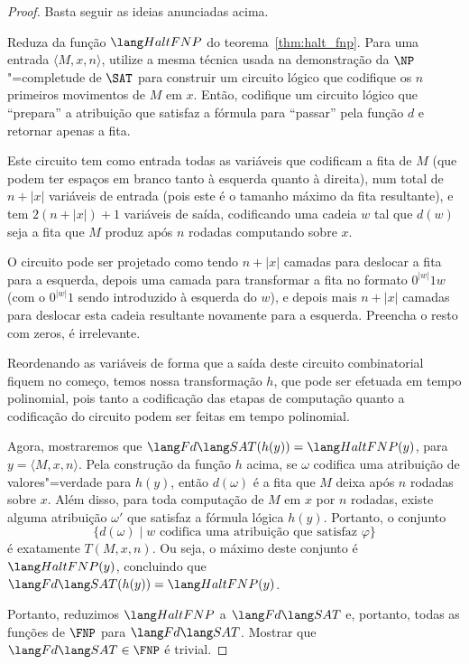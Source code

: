 \begin{proof}
    Basta seguir as ideias anunciadas acima.

    Reduza da função $\HaltFNP$ do teorema~\ref{thm:halt_fnp}.
    Para uma entrada $\langle M, x, n \rangle$,
    utilize a mesma técnica usada na demonstração da $\NP$"=completude de $\SAT$
    para construir um circuito lógico
    que codifique os $n$ primeiros movimentos de $M$ em $x$.
    Então,
    codifique um circuito lógico que ``prepara'' a atribuição que satisfaz a fórmula
    para ``passar'' pela função $d$ e retornar apenas a fita.

    Este circuito tem como entrada todas as variáveis que codificam a fita de $M$
    (que podem ter espaços em branco tanto à esquerda quanto à direita),
    num total de $n + |x|$ variáveis de entrada
    (pois este é o tamanho máximo da fita resultante),
    e tem $2(n + |x|) + 1$ variáveis de saída,
    codificando uma cadeia $w$ tal que
    $d(w)$ seja a fita que $M$ produz após $n$ rodadas computando sobre $x$.

    O circuito pode ser projetado como tendo $n + |x|$ camadas
    para deslocar a fita para a esquerda,
    depois uma camada para transformar a fita no formato $0^{|w|}1w$
    (com o $0^{|w|}1$ sendo introduzido à esquerda do $w$),
    e depois mais $n + |x|$ camadas para deslocar esta cadeia resultante
    novamente para a esquerda.
    Preencha o resto com zeros, é irrelevante.

    Reordenando as variáveis de forma que
    a saída deste circuito combinatorial fiquem no começo,
    temos nossa transformação $h$,
    que pode ser efetuada em tempo polinomial,
    pois tanto a codificação das etapas de computação
    quanto a codificação do circuito podem ser feitas em tempo polinomial.

    Agora, mostraremos que $\FdSAT(h(y)) = \HaltFNP(y)$,
    para $y = \langle M, x, n \rangle$.
    Pela construção da função $h$ acima,
    se $\omega$ codifica uma atribuição de valores"=verdade para $h(y)$,
    então $d(\omega)$ é a fita que $M$ deixa após $n$ rodadas sobre $x$.
    Além disso, para toda computação de $M$ em $x$ por $n$ rodadas,
    existe alguma atribuição $\omega'$ que satisfaz a fórmula lógica $h(y)$.
    Portanto, o conjunto
    \begin{equation*}
        \{d(\omega) \mid \text{$w$ codifica uma atribuição que satisfaz $\varphi$} \}
    \end{equation*}
    é exatamente $T(M, x, n)$.
    Ou seja, o máximo deste conjunto é $\HaltFNP(y)$,
    concluindo que $\FdSAT(h(y)) = \HaltFNP(y)$.

    Portanto, reduzimos $\HaltFNP$ a $\FdSAT$ e,
    portanto,
    todas as funções de $\FNP$ para $\FdSAT$.
    Mostrar que $\FdSAT \in \FNP$ é trivial.
\end{proof}

